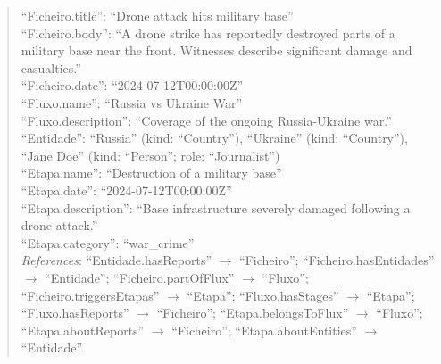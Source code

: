 \begin{quote}
\enquote{Ficheiro.title}: \enquote{Drone attack hits military base}\\
\enquote{Ficheiro.body}: \enquote{A drone strike has reportedly destroyed parts of a military base near the front. Witnesses describe significant damage and casualties.}\\
\enquote{Ficheiro.date}: \enquote{2024-07-12T00:00:00Z}\\
\enquote{Fluxo.name}: \enquote{Russia vs Ukraine War}\\
\enquote{Fluxo.description}: \enquote{Coverage of the ongoing Russia-Ukraine war.}\\
\enquote{Entidade}: \enquote{Russia} (kind: \enquote{Country}), \enquote{Ukraine} (kind: \enquote{Country}), \enquote{Jane Doe} (kind: \enquote{Person}; role: \enquote{Journalist})\\
\enquote{Etapa.name}: \enquote{Destruction of a military base}\\
\enquote{Etapa.date}: \enquote{2024-07-12T00:00:00Z}\\
\enquote{Etapa.description}: \enquote{Base infrastructure severely damaged following a drone attack.}\\
\enquote{Etapa.category}: \enquote{war\_crime}\\
	\textit{References}: \enquote{Entidade.hasReports} $\rightarrow$ \enquote{Ficheiro}; \enquote{Ficheiro.hasEntidades} $\rightarrow$ \enquote{Entidade}; \enquote{Ficheiro.partOfFlux} $\rightarrow$ \enquote{Fluxo}; \enquote{Ficheiro.triggersEtapas} $\rightarrow$ \enquote{Etapa}; \enquote{Fluxo.hasStages} $\rightarrow$ \enquote{Etapa}; \enquote{Fluxo.hasReports} $\rightarrow$ \enquote{Ficheiro}; \enquote{Etapa.belongsToFlux} $\rightarrow$ \enquote{Fluxo}; \enquote{Etapa.aboutReports} $\rightarrow$ \enquote{Ficheiro}; \enquote{Etapa.aboutEntities} $\rightarrow$ \enquote{Entidade}.
\end{quote}


